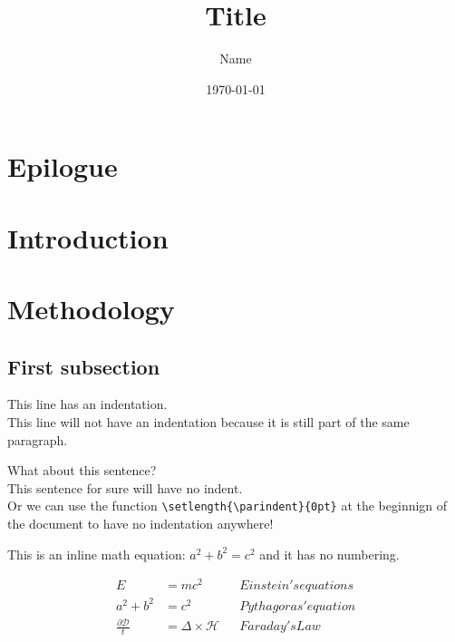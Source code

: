 \documentclass[a4paper]{article} %
\author{Name} %
\title{Title} %
\date{\today} %
\begin{document}


\maketitle %
\pagebreak %
\tableofcontents %
\pagebreak %

\section*{Epilogue} %
\lipsum[1] %

\section{Introduction} %
\lipsum[2-4]

\section{Methodology} %
\lipsum[1-3]

\subsection{First subsection} %
\lipsum[1]

\clearpage

This line has an indentation.\\
This line will not have an indentation because it is still part of the same paragraph.

What about this sentence?\\

\noindent This sentence for sure will have no indent.\\

Or we can use the function \verb|\setlength{\parindent}{0pt}| at the beginnign of the document to have no indentation anywhere!\\

\hrulefill

This is an inline math equation: $a^2 + b^2 = c^2$ and it has no numbering.

\begin{align}
E &= mc^2            	&& Einstein's equations \label{eq:einstein}     	\\
a^2 + b^2 &= c^2     && Pythagoras' equation \label{eq:pythagoras}		\\
\frac{\partial \mathcal D}{t} &= \Delta \times \mathcal H	&& Faraday's Law \label{eq:faraday}
\end{align}
\end{document}
